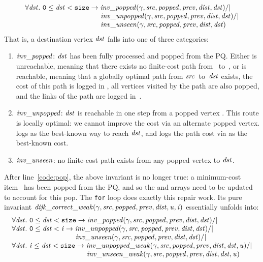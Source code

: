 \[
\begin{array}{l}
\forall \m{dst}.~\texttt{0} \le \m{dst} < \texttt{size} -> \m{inv\_popped}(\gamma, \m{src}, \m{popped}, \m{prev}, \m{dist}, \m{dst}) /| \null \\
\hspace{10.7em}\m{inv\_unpopped}(\gamma, \m{src}, \m{popped}, \m{prev}, \m{dist}, \m{dst}) /| \null \\
\hspace{10.7em}\m{inv\_unseen}(\gamma, \m{src}, \m{popped}, \m{prev}, \m{dist}, \m{dst})
\end{array}
\]
That is, a destination vertex $\mathit{dst}$ falls into one of three
categories:
\begin{enumerate}
\item $\mathit{inv\_popped}$: $\mathit{dst}$ has been fully processed and
popped from the PQ.
Either  is unreachable, meaning that there exists no finite-cost path from 
~to~, or  is reachable, meaning that a globally optimal 
path from $\mathit{src}$~to~$\mathit{dst}$ exists, the cost of this path is logged in
, all vertices visited by the path are also popped,
and the links of the path are logged in~.
\item $\mathit{inv\_unpopped}$: $\mathit{dst}$ is reachable in
one step from a popped vertex .
This route is locally optimal: we cannot
improve the cost via an alternate popped vertex.
 logs
 as the best-known way to reach $\mathit{dst}$, and 
logs the path cost via  as the best-known cost.
\item $\mathit{inv\_unseen}$: no finite-cost path exists from any popped vertex to
$\mathit{dst}$.
\end{enumerate}
After line~\ref{code:pop}, 
the above invariant is no longer true: a minimum-cost item~ has been 
popped from the PQ, and so the  and  arrays need to be 
updated to account for this pop. The \texttt{for} loop does exactly this repair work.
Its pure invariant 
$\mathit{dijk\_correct\_weak}(\gamma, \mathit{src}, \mathit{popped}, \mathit{prev}, \mathit{dist}, \mathit{u}, \mathit{i})$ essentially unfolds into:
\[
\begin{array}{l}
\forall \m{dst}.~\texttt{0} \le \m{dst} < \texttt{size} -> \m{inv\_popped}(\gamma, \m{src}, \m{popped}, \m{prev}, \m{dist}, \m{dst}) /| \null \\
\forall \m{dst}.~\texttt{0} \le \m{dst} < \m{i} -> \m{inv\_unpopped}(\gamma, \m{src}, \m{popped}, \m{prev}, \m{dist}, \m{dst}) /| \null \\
\hspace{9em}\m{inv\_unseen}(\gamma, \m{src}, \m{popped}, \m{prev}, \m{dist}, \m{dst}) /| \null \\
\forall \m{dst}.~\m{i} \le \m{dst} < \texttt{size} -> \m{inv\_unpopped\_weak}(\gamma, \m{src}, \m{popped}, \m{prev}, \m{dist}, \m{dst}, \m{u}) /| \null \\
\hspace{10.6em}\m{inv\_unseen\_weak}(\gamma, \m{src}, \m{popped}, \m{prev}, \m{dist}, \m{dst}, \m{u})
\end{array}
\]
